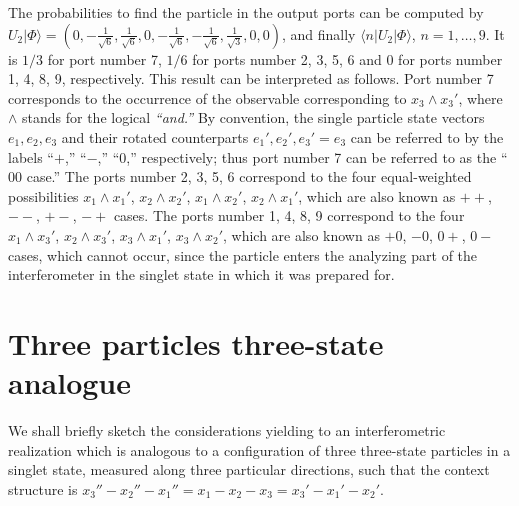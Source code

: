 \documentclass[pra,preprint,showpacs,showkeys,amsfonts]{revtex4}
\begin{document}
The probabilities to find the particle in the output ports can be computed by
$U_{2}\vert \Phi \rangle=
( 0,
-\frac{1}{{\sqrt{6}}}  ,
  \frac{1}{{\sqrt{6}}},
0,
-\frac{1}{{\sqrt{6}}}  ,
- \frac{1}{{\sqrt{6}}}  ,
  \frac{1}{{\sqrt{3}}},
0,
0)$, and finally
$\langle n \vert U_{2}\vert \Phi \rangle$, $n=1,\ldots ,9$.
It is $1/3$ for port number 7,
$1/6$ for ports number 2,  3, 5, 6
and $0$  for ports number 1, 4, 8, 9, respectively.
This result can be interpreted as follows.
Port number 7 corresponds to the occurrence of the observable corresponding to
$x_3\wedge x_3'$, where $\wedge$ stands for the logical {\em ``and.''}
By convention, the single particle state vectors
$e_1,e_2,e_3$
and their rotated counterparts
$e_1',e_2',e_3'=e_3$
can be referred to by the labels
``$+$,''
``$-$,''
``$0$,''
respectively;
thus
port number 7 can be referred to as the ``$00$ case.''
The ports number 2,  3, 5, 6 correspond to the four equal-weighted possibilities
$x_1\wedge x_1'$,
$x_2\wedge x_2'$,
$x_1\wedge x_2'$,
$x_2\wedge x_1'$,
which are also known as $++$, $--$, $+-$, $-+$ cases.
The ports number 1, 4, 8, 9 correspond to the four
$x_1\wedge x_3'$,
$x_2\wedge x_3'$,
$x_3\wedge x_1'$,
$x_3\wedge x_2'$,
which are also known as $+0$, $-0$, $0+$, $0-$ cases,
which cannot occur, since the particle enters the analyzing part
of the interferometer in the singlet state in which it was prepared for.


\section{Three particles three-state analogue}
\label{2004-analog-3p3s}

We shall briefly sketch the considerations yielding to an interferometric realization
which is analogous to a configuration of three three-state particles in a singlet state,
measured along three particular directions, such that
the context structure is $x_3''-x_2''-x_1''=x_1-x_2-x_3=x_3'-x_1'-x_2'$.
\end{document}
